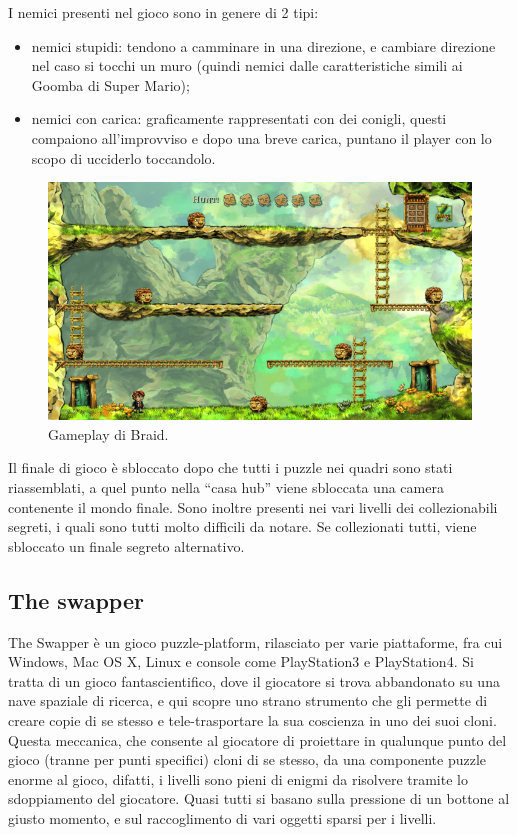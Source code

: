 I nemici presenti nel gioco sono in genere di 2 tipi:

\begin{itemize}
\item nemici stupidi: tendono a camminare in una direzione, e cambiare direzione nel caso si tocchi un muro (quindi nemici dalle caratteristiche simili ai Goomba di Super Mario);
\item nemici con carica: graficamente rappresentati con dei conigli, questi compaiono all'improvviso e dopo una breve carica, puntano il player con lo scopo di ucciderlo toccandolo.
\end{itemize}

\begin{figure}[h]
\centerline{\includegraphics[scale=0.5]{images/statoarte/bgameplay.png}}
\caption{Gameplay di Braid.}
\label{fig:bgameplay}
\end{figure}

Il finale di gioco è sbloccato dopo che tutti i puzzle nei quadri sono stati riassemblati, a quel punto nella ``casa hub'' viene sbloccata una camera contenente il mondo finale.
Sono inoltre presenti nei vari livelli dei collezionabili segreti, i quali sono tutti molto difficili da notare. Se collezionati tutti, viene sbloccato un finale segreto alternativo.



\subsection{The swapper}
\label{sec:stato_arte_swapper}

The Swapper è un gioco puzzle-platform, rilasciato per varie piattaforme, fra cui Windows, Mac OS X, Linux e console come PlayStation3 e PlayStation4. Si tratta di un gioco fantascientifico, dove il giocatore si trova abbandonato su una nave spaziale di ricerca, e qui scopre uno strano strumento che gli permette di creare copie di se stesso e tele-trasportare la sua coscienza in uno dei suoi cloni. Questa meccanica, che consente al giocatore di proiettare in qualunque punto del gioco (tranne per punti specifici) cloni di se stesso, da una componente puzzle enorme al gioco, difatti, i livelli sono pieni di enigmi da risolvere tramite lo sdoppiamento del giocatore. Quasi tutti si basano sulla pressione di un bottone al giusto momento, e sul raccoglimento di vari oggetti sparsi per i livelli.

